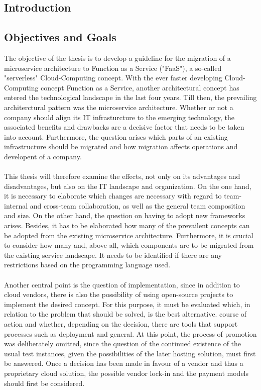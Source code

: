 \documentclass[a4paper,twoside,11pt, pagesize]{scrartcl}
\begin{document}
\begin{spacing}{1.2}
\section{Introduction}


\subsection{Objectives and Goals}
The objective of the thesis is to develop a guideline for the migration of a microservice architecture to Function as a Service ("FaaS"), a so-called "serverless" Cloud-Computing concept. With the ever faster developing Cloud-Computing concept Function as a Service, another architectural concept has entered the technological landscape in the last four years. Till then, the prevailing architerctural pattern was the microservice architecture. Whether or not a company should align its IT infrasturcture to the emerging technology, the associated benefits and drawbacks are a decisive factor that needs to be taken into account. Furthermore, the question arises which parts of an existing infrastructure should be migrated and how migration affects operations and developent of a company.\\\\
This thesis will therefore examine the effects, not only on its advantages and disadvantages, but also on the IT landscape and organization. On the one hand, it is necessary to elaborate which changes are necessary with regard to team-internal and cross-team collaboration, as well as the general team composition and size. On the other hand, the question on having to adopt new frameworks arises. Besides, it has to be elaborated how many of the prevailent concepts can be adopted from the existing microservice architecture. Furthermore, it is crucial to consider how many and, above all, which components are to be migrated from the existing service landscape. It needs to be identified if there are any restrictions based on the programming language used. 
\\\\Another central point is the question of implementation, since in addition to cloud vendors, there is also the possibility of using open-source projects to implement the desired concept. For this purpose, it must be evaluated which, in relation to the problem that should be solved, is the best alternative. course of action and whether, depending on the decision, there are tools that support processes such as deployment and general. At this point, the process of promotion was deliberately omitted, since the question of the continued existence of the usual test instances, given the possibilities of the later hosting solution, must first be answered. Once a decision has been made in favour of a vendor and thus a proprietary cloud solution, the possible vendor lock-in and the payment models should first be considered. \\\\

\end{spacing}
\end{document}
